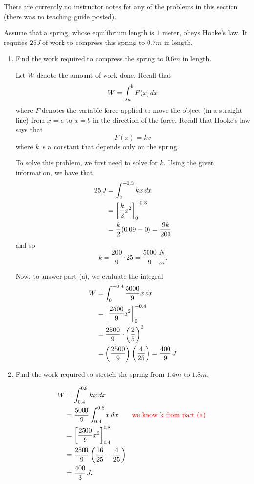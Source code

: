 \documentclass[]{ximera}
\begin{document}
\begin{instructorNotes}
There are currently no instructor notes for any of the problems in this section (there was no teaching guide posted).
\end{instructorNotes}







\begin{problem}
Assume that a spring, whose equilibrium length is $1$ meter, obeys Hooke's law.
It requires $25J$ of work to compress this spring to $0.7m$ in length.  
	\begin{enumerate}
		\item  Find the work required to compress the spring to $0.6m$ in length.  
		\begin{freeResponse}
		Let $W$ denote the amount of work done.  
		Recall that
			\[
			W = \int_a^b F(x) \,d x
			\]
		where $F$ denotes the variable force applied to move the object (in a straight line) from $x=a$ to $x=b$ in the direction of the force.  
		Recall that Hooke's law says that
			\[
			F(x) = k x
			\]
		where $k$ is a constant that depends only on the spring.  
		
		To solve this problem, we first need to solve for $k$.  
		Using the given information, we have that
			\begin{align*}
			25 \, J &= \int_0^{-0.3} kx \,d x  \\
			&= \bigg[ \frac{k}{2} x^2 \bigg]_0^{-0.3}  \\
			&= \frac{k}{2} (0.09 - 0) = \frac{9k}{200}
			\end{align*}
		and so
			\[
			k = \frac{200}{9} \cdot 25 = \frac{5000}{9} \, \frac{N}{m}.
			\]
			
		Now, to answer part (a), we evaluate the integral
			\begin{align*}
			W &= \int_0^{-0.4} \frac{5000}{9} x \,d x  \\
			&= \bigg[ \frac{2500}{9} x^2 \bigg]_0^{-0.4}  \\
			&= \frac{2500}{9} \cdot \left( \frac{2}{5} \right)^2   \\
			&= \left( \frac{2500}{9} \right) \left( \frac{4}{25} \right) = \frac{400}{9} \, J
			\end{align*}
		\end{freeResponse}
		
		
		
		\item  Find the work required to stretch the spring from $1.4m$ to $1.8m$.
		\begin{freeResponse}
			\begin{align*}
			W &= \int_{0.4}^{0.8} k x \,d x  \\
			&= \frac{5000}{9} \int_{0.4}^{0.8} x \,d x \qquad \text{{\color{red} we know k from part (a) }}\\
			&= \bigg[ \frac{2500}{9} x^2 \bigg]_{0.4}^{0.8}  \\
			&= \frac{2500}{9} \left( \frac{16}{25} - \frac{4}{25} \right)  \\
			&= \frac{400}{3} \, J.
			\end{align*}
		\end{freeResponse}
		

\end{enumerate}
\end{problem}
\end{document}
